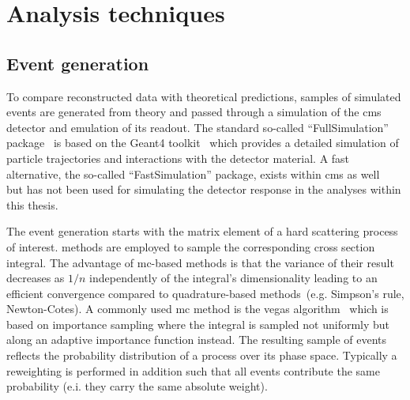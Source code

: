 \chapter{Analysis techniques}


\section{Event generation}

To compare reconstructed data with theoretical predictions, samples of simulated events are generated from theory and passed through a simulation of the \gls{cms} detector and emulation of its readout. The standard so-called ``FullSimulation'' package~\cite{1742-6596-396-2-022003,1742-6596-664-7-072022} is based on the Geant4 toolkit~\cite{Agostinelli2003250} which provides a detailed simulation of particle trajectories and interactions with the detector material. A fast alternative, the so-called ``FastSimulation'' package, exists within \gls{cms} as well~\cite{fsimRahmat} but has not been used for simulating the detector response in the analyses within this thesis.

The event generation starts with the matrix element of a hard scattering process of interest.  methods are employed to sample the corresponding cross section integral. The advantage of \gls{mc}-based methods is that the variance of their result decreases as $1/n$ independently of the integral's dimensionality leading to an efficient convergence compared to quadrature-based methods~(e.g. Simpson's rule, Newton-Cotes). A commonly used \gls{mc} method is the \gls{vegas} algorithm~\cite{OHL199913} which is based on importance sampling where the integral is sampled not uniformly but along an adaptive importance function instead. The resulting sample of events reflects the probability distribution of a process over its phase space. Typically a reweighting is performed in addition such that all events contribute the same probability (e.i. they carry the same absolute weight). 

